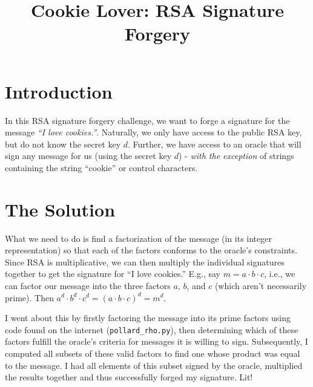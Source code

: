 \documentclass{article}
\title{Cookie Lover: RSA Signature Forgery}
\begin{document}
\maketitle

\section{Introduction}

In this RSA signature forgery challenge, we want to forge a signature for the message \emph{``I love cookies.''}. Naturally, we only have access to the public RSA key, but do not know the secret key $d$. Further, we have access to an oracle that will sign any message for us (using the secret key $d$) - \emph{with the exception} of strings containing the string ``cookie'' or control characters. 

\section{The Solution}

What we need to do is find a factorization of the message (in its integer representation) so that each of the factors conforms to the oracle's constraints. Since RSA is multiplicative, we can then multiply the individual signatures together to get the signature for ``I love cookies.'' E.g., say $m = a \cdot b \cdot c$, i.e., we can factor our message into the three factors $a$, $b$, and $c$ (which aren't necessarily prime). Then $a^d \cdot b^d \cdot c^d = (a \cdot b \cdot c)^d = m^d$.

\medskip

I went about this by firstly factoring the message into its prime factors using code found on the internet (\texttt{pollard\_rho.py}), then determining which of these factors fulfill the oracle's criteria for messages it is willing to sign. Subsequently, I computed all subsets of these valid factors to find one whose product was equal to the message. I had all elements of this subset signed by the oracle, multiplied the results together and thus successfully forged my signature. Lit!
\end{document}
